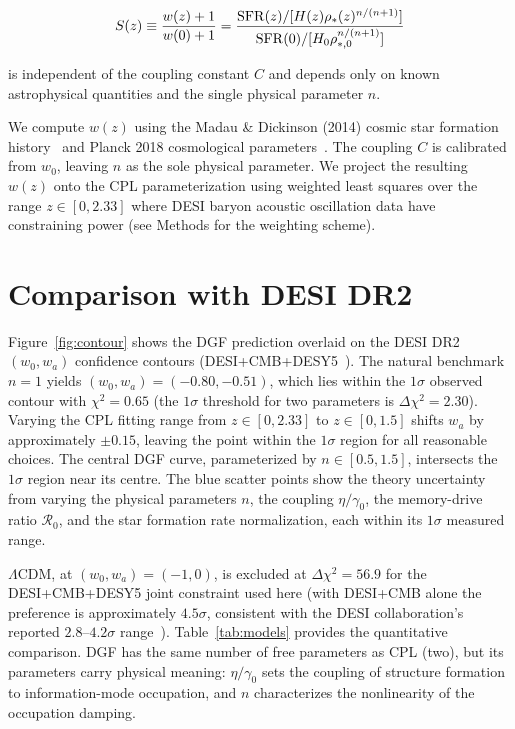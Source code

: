 \documentclass[12pt,a4paper]{article}
\begin{document}
\begin{equation}\label{eq:norm}
S(z)\equiv\frac{w(z)+1}{w(0)+1} = \frac{{\rm SFR}(z)/[H(z)\rho_*(z)^{n/(n+1)}]}{{\rm SFR}(0)/[H_0\rho_{*,0}^{n/(n+1)}]}
\end{equation}

is independent of the coupling constant $C$ and depends only on known astrophysical quantities and the single physical parameter $n$.

We compute $w(z)$ using the Madau \& Dickinson (2014) cosmic star formation history~\cite{madau2014} and Planck 2018 cosmological parameters~\cite{planck2018}. The coupling $C$ is calibrated from $w_0$, leaving $n$ as the sole physical parameter. We project the resulting $w(z)$ onto the CPL parameterization using weighted least squares over the range $z\in[0,2.33]$ where DESI baryon acoustic oscillation data have constraining power (see Methods for the weighting scheme).

\section*{Comparison with DESI DR2}

Figure~\ref{fig:contour} shows the DGF prediction overlaid on the DESI DR2 $(w_0,w_a)$ confidence contours (DESI+CMB+DESY5~\cite{zhang2026}). The natural benchmark $n=1$ yields $(w_0,w_a)=(-0.80,-0.51)$, which lies within the $1\sigma$ observed contour with $\chi^2=0.65$ (the $1\sigma$ threshold for two parameters is $\Delta\chi^2=2.30$). Varying the CPL fitting range from $z\in[0,2.33]$ to $z\in[0,1.5]$ shifts $w_a$ by approximately $\pm0.15$, leaving the point within the $1\sigma$ region for all reasonable choices. The central DGF curve, parameterized by $n\in[0.5,1.5]$, intersects the $1\sigma$ region near its centre. The blue scatter points show the theory uncertainty from varying the physical parameters $n$, the coupling $\eta/\gamma_0$, the memory-drive ratio $\mathcal{R}_0$, and the star formation rate normalization, each within its $1\sigma$ measured range.

$\Lambda$CDM, at $(w_0,w_a)=(-1,0)$, is excluded at $\Delta\chi^2=56.9$ for the DESI+CMB+DESY5 joint constraint used here (with DESI+CMB alone the preference is approximately $4.5\sigma$, consistent with the DESI collaboration's reported $2.8$--$4.2\sigma$ range~\cite{desi2025}). Table~\ref{tab:models} provides the quantitative comparison. DGF has the same number of free parameters as CPL (two), but its parameters carry physical meaning: $\eta/\gamma_0$ sets the coupling of structure formation to information-mode occupation, and $n$ characterizes the nonlinearity of the occupation damping.
\end{document}
